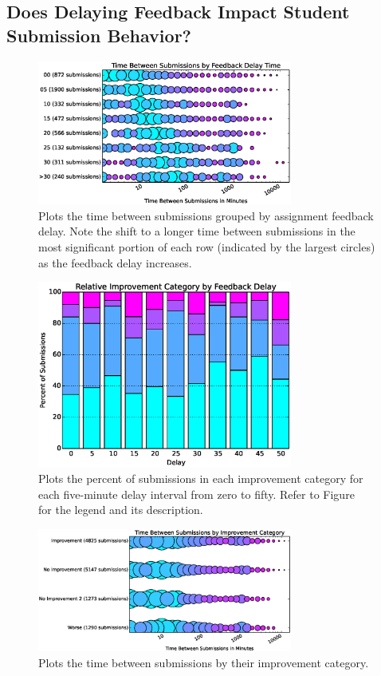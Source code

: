\subsection{Does Delaying Feedback Impact Student Submission Behavior?}

\begin{figure}[!t]
\centering
\includegraphics[width=3.3in]{graphs/Time_Between_Submissions_by_Feedback_Delay_Time.eps}
\caption{Plots the time between submissions grouped by assignment feedback
  delay. Note the shift to a longer time between submissions in the most
  significant portion of each row (indicated by the largest circles) as the
  feedback delay increases.}
\end{figure}

\begin{figure}[!t]
\centering
\includegraphics[width=3.3in]{graphs/Relative_Improvement_Category_by_Feedback_Delay.eps}
\caption{Plots the percent of submissions in each improvement category for each
  five-minute delay interval from zero to fifty. Refer to
  Figure~ for the legend and its description.}
\end{figure}

\begin{figure}[!t]
\centering \includegraphics[width=3.3in]{graphs/Time_Between_Submissions_by_Improvement_Category.eps}
\caption{Plots the time between submissions by their improvement category.}
\end{figure}

